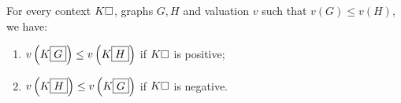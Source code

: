 
\begin{lemma}[Variance]
  
  For every context $K\square$, graphs $G, H$ and valuation $v$ such that $v(G)
  \leq v(H)$, we have:
  \begin{enumerate}
    \item $v\left(K\fbox{$G$}\right) \leq v\left(K\fbox{$H$}\right)$ if $K\square$
    is positive;
    \item $v\left(K\fbox{$H$}\right) \leq v\left(K\fbox{$G$}\right)$ if $K\square$
    is negative.
  \end{enumerate}
\end{lemma}
